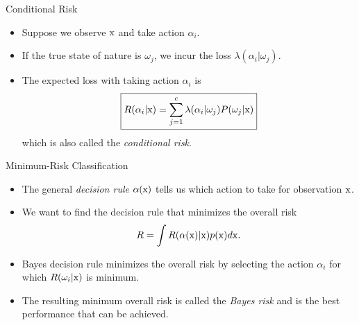\begin{frame}{Conditional Risk}
\begin{itemize}
\setlength{\itemsep}{4pt}
\item Suppose we observe ${\rm x}$ and take action $\alpha_i$.
\item If the true state of nature is $\omega_j$, we incur the loss $\lambda(\alpha_i|\omega_j)$.
\item The expected loss with taking action $\alpha_i$ is
\[\boxed{R(\alpha_i|{\rm x})=\sum_{j=1}^{c}\lambda(\alpha_i|\omega_j)P(\omega_j|{\rm x})}\]
which is also called the \textit{\color{mycolor1}conditional risk}.
\end{itemize}
\end{frame}

\begin{frame}{Minimum-Risk Classification}
\begin{itemize}
\setlength{\itemsep}{4pt}
\item The general \textit{\color{mycolor2}decision rule} $\alpha({\rm x})$ tells us which action to take for observation ${\rm x}$.
\item We want to find the decision rule that minimizes the overall risk
\[R=\int R(\alpha({\rm x})|{\rm x})p({\rm x})d{\rm x}.\]
\item Bayes decision rule minimizes the overall risk by selecting the action $\alpha_i$ for which $R(\omega_i|{\rm x})$ is {\color{mycolor2}minimum}.
\item The resulting minimum overall risk is called the \textit{\color{mycolor2}Bayes risk} and is the best performance that can be achieved.
\end{itemize}
\end{frame}
%

